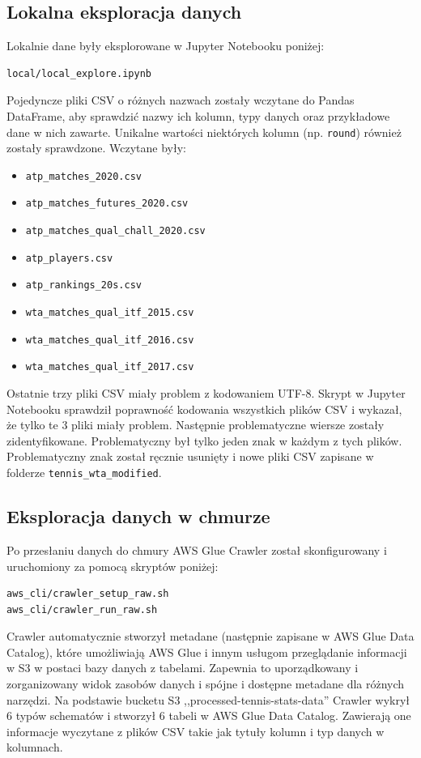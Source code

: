 \documentclass[12pt, a4paper]{article}
\begin{document}
\subsection{Lokalna eksploracja danych}
Lokalnie dane były eksplorowane w Jupyter Notebooku poniżej:
\begin{verbatim}
local/local_explore.ipynb
\end{verbatim}
Pojedyncze pliki CSV o różnych nazwach zostały wczytane do Pandas DataFrame, aby sprawdzić nazwy ich kolumn, typy danych oraz przykładowe dane w nich zawarte. Unikalne wartości niektórych kolumn (np. \lstinline[style=verbatimStyle]{round}) również zostały sprawdzone. Wczytane były:
\begin{itemize}
    \item \lstinline[style=verbatimStyle]{atp_matches_2020.csv}
    \item \lstinline[style=verbatimStyle]{atp_matches_futures_2020.csv}
    \item \lstinline[style=verbatimStyle]{atp_matches_qual_chall_2020.csv}
    \item \lstinline[style=verbatimStyle]{atp_players.csv}
    \item \lstinline[style=verbatimStyle]{atp_rankings_20s.csv}
    \item \lstinline[style=verbatimStyle]{wta_matches_qual_itf_2015.csv}
    \item \lstinline[style=verbatimStyle]{wta_matches_qual_itf_2016.csv}
    \item \lstinline[style=verbatimStyle]{wta_matches_qual_itf_2017.csv}
\end{itemize}
Ostatnie trzy pliki CSV miały problem z kodowaniem UTF-8. Skrypt w Jupyter Notebooku sprawdził poprawność kodowania wszystkich plików CSV i wykazał, że tylko te 3 pliki miały problem. Następnie problematyczne wiersze zostały zidentyfikowane. Problematyczny był tylko jeden znak w każdym z tych plików. Problematyczny znak został ręcznie usunięty i nowe pliki CSV zapisane w folderze \lstinline[style=verbatimStyle]{tennis_wta_modified}.

\subsection{Eksploracja danych w chmurze}
Po przesłaniu danych do chmury AWS Glue Crawler został skonfigurowany i uruchomiony za pomocą skryptów poniżej:
\begin{verbatim}
aws_cli/crawler_setup_raw.sh
aws_cli/crawler_run_raw.sh
\end{verbatim}
Crawler automatycznie stworzył metadane (następnie zapisane w AWS Glue Data Catalog), które umożliwiają AWS Glue i innym usługom przeglądanie informacji w S3 w postaci bazy danych z tabelami. Zapewnia to uporządkowany i zorganizowany widok zasobów danych i spójne i dostępne metadane dla różnych narzędzi. Na podstawie bucketu S3 ,,processed-tennis-stats-data'' Crawler wykrył 6 typów schematów i stworzył 6 tabeli w AWS Glue Data Catalog. Zawierają one informacje wyczytane z plików CSV takie jak tytuły kolumn i typ danych w kolumnach.
\end{document}
